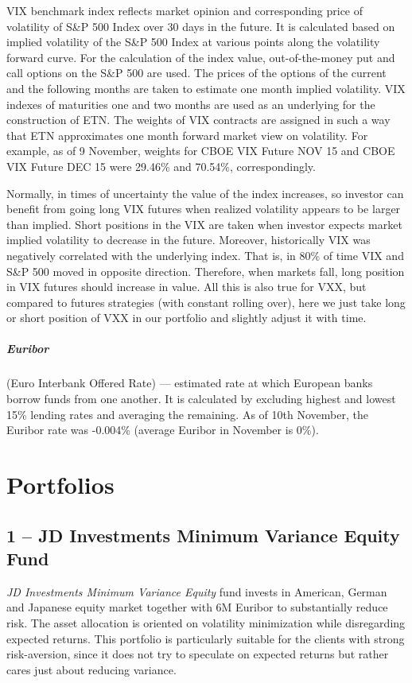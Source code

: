\documentclass{scrreprt}
\begin{document}
VIX benchmark index reflects market opinion and corresponding price of volatility of S\&P 500 Index over 30 days in the future.
It is calculated based on implied volatility of the S\&P 500 Index at various points along the volatility forward curve.
For the calculation of the index value, out-of-the-money put and call options on the S\&P 500 are used.
The prices of the options of the current and the following months are taken to estimate one month implied volatility.
VIX indexes of maturities one and two months are used as an underlying for the construction of ETN.
The weights of VIX contracts are assigned in such a way that ETN approximates one month forward market view on volatility.
For example, as of 9 November, weights for CBOE VIX Future NOV 15 and CBOE VIX Future DEC 15 were 29.46\% and 70.54\%, correspondingly.

Normally, in times of uncertainty the value of the index increases, so investor can benefit from going long VIX futures when realized volatility appears to be larger than implied.
Short positions in the VIX are taken when investor expects market implied volatility to decrease in the future.
Moreover, historically VIX was negatively correlated with the underlying index.
That is, in 80\% of time VIX and S\&P 500 moved in opposite direction.
Therefore, when markets fall, long position in VIX futures should increase in value.
All this is also true for VXX, but compared to futures strategies (with constant rolling over), here we just take long or short position of VXX in our portfolio and slightly adjust it with time.

 
\paragraph{Euribor} (Euro Interbank Offered Rate) –-- estimated rate at which European banks borrow funds from one another.
It is calculated by excluding highest and lowest 15\% lending rates and averaging the remaining.
As of 10th November, the Euribor rate was -0.004\% (average Euribor in November is 0\%).

\chapter*{Portfolios}

\section*{1 -- JD Investments Minimum Variance Equity Fund}
\textit{JD Investments Minimum Variance Equity} fund invests in American, German and Japanese equity market together with 6M Euribor to substantially reduce risk.
The asset allocation is oriented on volatility minimization while disregarding expected returns.
This portfolio is particularly suitable for the clients with strong risk-aversion, since it does not try to speculate on expected returns but rather cares just about reducing variance.
\end{document}

